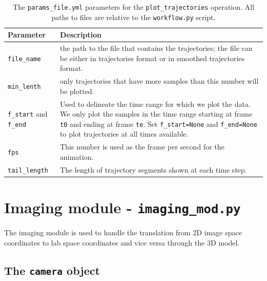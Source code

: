 \documentclass[10pt,a4paper]{article}
\begin{document}
\begin{table}[!ht]
	\centering
	\caption{The \texttt{params\_file.yml} parameters for the \texttt{plot\_trajectories} operation. All paths to files are relative to the \texttt{workflow.py} script. \label{tab:animation_parameter}}
	\begin{tabular}{l m{12cm}}
		\hline
		Parameter & Description\\[.2cm]
		\hline
		\texttt{file\_name} & the path to the file that contains the trajectories; the file can be either in trajectories format or in smoothed trajectories format. \\[.2cm]
		\texttt{min\_lenth} & only trajectories that have more samples than this number will be plotted.\\[.2cm]
		\texttt{f\_start} and \texttt{f\_end} & Used to delineate the time range for which we plot the data. We only plot the samples in the time range starting at frame \texttt{t0} and ending at frame \texttt{te}. Set \texttt{f\_start=None} and \texttt{f\_end=None} to plot trajectories at all times available. \\[.2cm]
		\texttt{fps} & This number is used as the frame per second for the animation.\\[.2cm]
		\texttt{tail\_length} & The length of trajectory segments shown at each time step.\\[.2cm] 
		\hline
	\end{tabular}
\end{table}
















\clearpage


\section{Imaging module - \texttt{imaging\_mod.py}}\label{sec:image_mod}


The imaging module is used to handle the translation from 2D image space coordinates to lab space coordinates and vice versa through the 3D model. 



\subsection{The \texttt{camera} object}\label{sec:camera}
\end{document}
